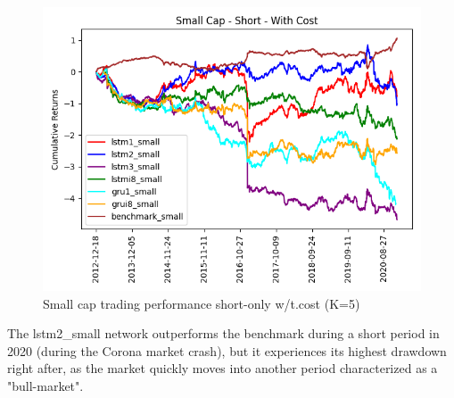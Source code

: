 \begin{figure}[H]
\centering
\includegraphics [scale=0.60,angle=360]{figures/cumulative_small_cap_return_with_cost_s.png}
\caption{Small cap trading performance short-only w/t.cost (K=5)}
\label{fig:shortlsmallc}
\end{figure} 
\indent\newline 
The lstm2\_small network outperforms the benchmark during a short period in 2020 (during the Corona market crash), but it experiences its highest drawdown right after, as the market quickly moves into another period characterized as a "bull-market". 

